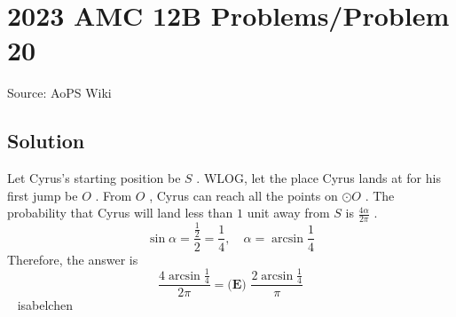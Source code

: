 \documentclass[12pt]{article}
\begin{document}
\section*{{2023 AMC 12B Problems/Problem 20}}
Source: AoPS Wiki

\subsection*{Solution}
Let Cyrus's starting position be $S$ . WLOG, let the place Cyrus lands at for his first jump be $O$ . From $O$ , Cyrus can reach all the points on $\odot O$ . The probability that Cyrus will land less than $1$ unit away from $S$ is $\frac{4 \alpha }{ 2 \pi}$ . \[\sin \alpha = \frac{ \frac12 }{2} = \frac14, \quad \alpha = \arcsin \frac14\] Therefore, the answer is \[\frac{4 \arcsin \frac14 }{ 2 \pi} = \boxed{\textbf{(E) } \frac{2 \arcsin \frac{1}{4}}{\pi}}\] ~ isabelchen
\end{document}
